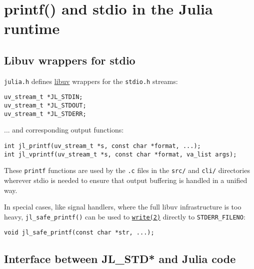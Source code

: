 \hypertarget{12315144918899798229}{}


\section{printf() and stdio in the Julia runtime}



\hypertarget{12808189198177172525}{}


\subsection{Libuv wrappers for stdio}



\texttt{julia.h} defines \href{http://docs.libuv.org}{libuv} wrappers for the \texttt{stdio.h} streams:




\begin{lstlisting}
uv_stream_t *JL_STDIN;
uv_stream_t *JL_STDOUT;
uv_stream_t *JL_STDERR;
\end{lstlisting}



... and corresponding output functions:




\begin{lstlisting}
int jl_printf(uv_stream_t *s, const char *format, ...);
int jl_vprintf(uv_stream_t *s, const char *format, va_list args);
\end{lstlisting}



These \texttt{printf} functions are used by the \texttt{.c} files in the \texttt{src/} and \texttt{cli/} directories wherever stdio is needed to ensure that output buffering is handled in a unified way.



In special cases, like signal handlers, where the full libuv infrastructure is too heavy, \texttt{jl\_safe\_printf()} can be used to \hyperlink{16947913578760238729}{\texttt{write(2)}} directly to \texttt{STDERR\_FILENO}:




\begin{lstlisting}
void jl_safe_printf(const char *str, ...);
\end{lstlisting}



\hypertarget{9919396910097555458}{}


\subsection{Interface between JL\_STD* and Julia code}



